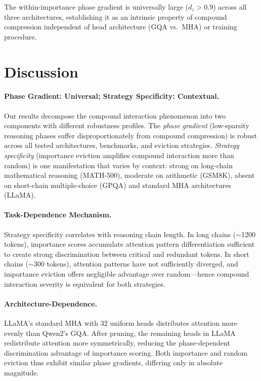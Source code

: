 \documentclass[11pt,a4paper]{article}
\begin{document}
The within-importance phase gradient is universally large ($d_z > 0.9$) across all three architectures, establishing it as an intrinsic property of compound compression independent of head architecture (GQA vs.\ MHA) or training procedure.

\section{Discussion}

\paragraph{Phase Gradient: Universal; Strategy Specificity: Contextual.}
Our results decompose the compound interaction phenomenon into two components with different robustness profiles. The \emph{phase gradient} (low-sparsity reasoning phases suffer disproportionately from compound compression) is robust across all tested architectures, benchmarks, and eviction strategies. \emph{Strategy specificity} (importance eviction amplifies compound interaction more than random) is one manifestation that varies by context: strong on long-chain mathematical reasoning (MATH-500), moderate on arithmetic (GSM8K), absent on short-chain multiple-choice (GPQA) and standard MHA architectures (LLaMA).

\paragraph{Task-Dependence Mechanism.}
Strategy specificity correlates with reasoning chain length. In long chains ($\sim$1200 tokens), importance scores accumulate attention pattern differentiation sufficient to create strong discrimination between critical and redundant tokens. In short chains ($\sim$300 tokens), attention patterns have not sufficiently diverged, and importance eviction offers negligible advantage over random---hence compound interaction severity is equivalent for both strategies.

\paragraph{Architecture-Dependence.}
LLaMA's standard MHA with 32 uniform heads distributes attention more evenly than Qwen2's GQA. After pruning, the remaining heads in LLaMA redistribute attention more symmetrically, reducing the phase-dependent discrimination advantage of importance scoring. Both importance and random eviction thus exhibit similar phase gradients, differing only in absolute magnitude.
\end{document}
